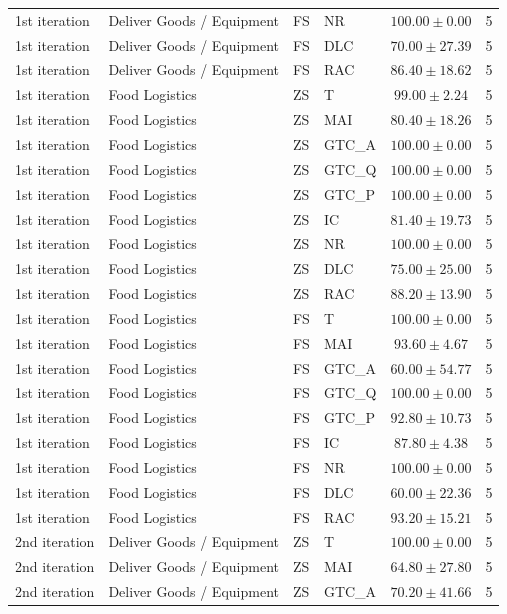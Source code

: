 \begin{longtable}{llllcr}
1st iteration & Deliver Goods / Equipment & FS & NR & $100.00 \pm 0.00$ & 5 \\
1st iteration & Deliver Goods / Equipment & FS & DLC & $70.00 \pm 27.39$ & 5 \\
1st iteration & Deliver Goods / Equipment & FS & RAC & $86.40 \pm 18.62$ & 5 \\
1st iteration & Food Logistics & ZS & T & $99.00 \pm 2.24$ & 5 \\
1st iteration & Food Logistics & ZS & MAI & $80.40 \pm 18.26$ & 5 \\
1st iteration & Food Logistics & ZS & GTC_A & $100.00 \pm 0.00$ & 5 \\
1st iteration & Food Logistics & ZS & GTC_Q & $100.00 \pm 0.00$ & 5 \\
1st iteration & Food Logistics & ZS & GTC_P & $100.00 \pm 0.00$ & 5 \\
1st iteration & Food Logistics & ZS & IC & $81.40 \pm 19.73$ & 5 \\
1st iteration & Food Logistics & ZS & NR & $100.00 \pm 0.00$ & 5 \\
1st iteration & Food Logistics & ZS & DLC & $75.00 \pm 25.00$ & 5 \\
1st iteration & Food Logistics & ZS & RAC & $88.20 \pm 13.90$ & 5 \\
1st iteration & Food Logistics & FS & T & $100.00 \pm 0.00$ & 5 \\
1st iteration & Food Logistics & FS & MAI & $93.60 \pm 4.67$ & 5 \\
1st iteration & Food Logistics & FS & GTC_A & $60.00 \pm 54.77$ & 5 \\
1st iteration & Food Logistics & FS & GTC_Q & $100.00 \pm 0.00$ & 5 \\
1st iteration & Food Logistics & FS & GTC_P & $92.80 \pm 10.73$ & 5 \\
1st iteration & Food Logistics & FS & IC & $87.80 \pm 4.38$ & 5 \\
1st iteration & Food Logistics & FS & NR & $100.00 \pm 0.00$ & 5 \\
1st iteration & Food Logistics & FS & DLC & $60.00 \pm 22.36$ & 5 \\
1st iteration & Food Logistics & FS & RAC & $93.20 \pm 15.21$ & 5 \\
2nd iteration & Deliver Goods / Equipment & ZS & T & $100.00 \pm 0.00$ & 5 \\
2nd iteration & Deliver Goods / Equipment & ZS & MAI & $64.80 \pm 27.80$ & 5 \\
2nd iteration & Deliver Goods / Equipment & ZS & GTC_A & $70.20 \pm 41.66$ & 5 \\

\end{longtable}
